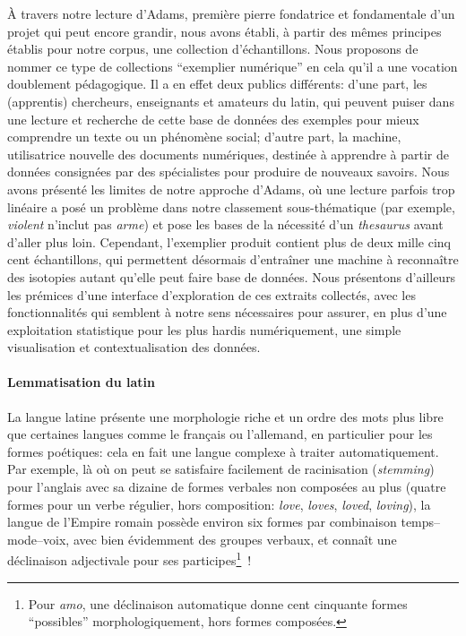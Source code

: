 À travers notre lecture d'Adams, première pierre fondatrice et fondamentale d'un projet qui peut encore grandir, nous avons établi, à partir des mêmes principes établis pour notre corpus, une collection d'échantillons. Nous proposons de nommer ce type de collections \enquote{exemplier numérique} en cela qu'il a une vocation doublement pédagogique. Il a en effet deux publics différents: d'une part, les (apprentis) chercheurs, enseignants et amateurs du latin, qui peuvent puiser dans une lecture et recherche de cette base de données des exemples pour mieux comprendre un texte ou un phénomène social; d'autre part, la machine, utilisatrice nouvelle des documents numériques, destinée à apprendre à partir de données consignées par des spécialistes pour produire de nouveaux savoirs. Nous avons présenté les limites de notre approche d'Adams, où une lecture parfois trop linéaire a posé un problème dans notre classement sous-thématique (par exemple, \textit{violent} n'inclut pas \textit{arme}) et pose les bases de la nécessité d'un \textit{thesaurus} avant d'aller plus loin. Cependant, l'exemplier produit contient plus de deux mille cinq cent échantillons, qui permettent désormais d'entraîner une machine à reconnaître des isotopies autant qu'elle peut faire base de données. Nous présentons d'ailleurs les prémices d'une interface d'exploration de ces extraits collectés, avec les fonctionnalités qui semblent à notre sens nécessaires pour assurer, en plus d'une exploitation statistique pour les plus hardis numériquement, une simple visualisation et contextualisation des données.

\paragraph{Lemmatisation du latin}

La langue latine présente une morphologie riche et un ordre des mots plus libre que certaines langues comme le français ou l'allemand, en particulier pour les formes poétiques: cela en fait une langue complexe à traiter automatiquement. Par exemple, là où on peut se satisfaire facilement de racinisation (\textit{stemming}) pour l'anglais avec sa dizaine de formes verbales non composées au plus (quatre formes pour un verbe régulier, hors composition: \textit{love}, \textit{loves}, \textit{loved}, \textit{loving}), la langue de l'Empire romain possède environ six formes par combinaison temps--mode--voix, avec bien évidemment des groupes verbaux, et connaît une déclinaison adjectivale pour ses participes\footnote{Pour \textit{amo}, une déclinaison automatique donne cent cinquante formes \enquote{possibles} morphologiquement, hors formes composées.}~! 

